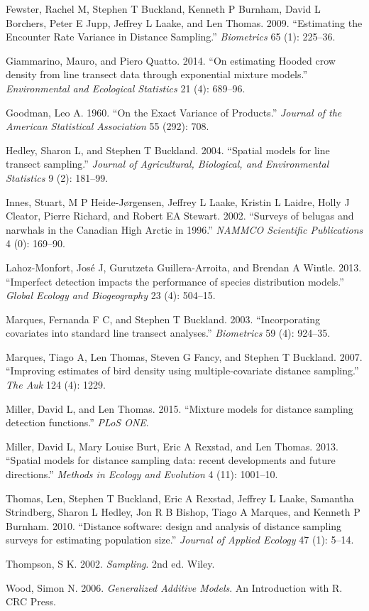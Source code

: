 \documentclass[article]{jss}
\begin{document}
Fewster, Rachel M, Stephen T Buckland, Kenneth P Burnham, David L
Borchers, Peter E Jupp, Jeffrey L Laake, and Len Thomas. 2009.
``Estimating the Encounter Rate Variance in Distance Sampling.''
\emph{Biometrics} 65 (1): 225--36.

Giammarino, Mauro, and Piero Quatto. 2014. ``On estimating Hooded crow
density from line transect data through exponential mixture models.''
\emph{Environmental and Ecological Statistics} 21 (4): 689--96.

Goodman, Leo A. 1960. ``On the Exact Variance of Products.''
\emph{Journal of the American Statistical Association} 55 (292): 708.

Hedley, Sharon L, and Stephen T Buckland. 2004. ``Spatial models for
line transect sampling.'' \emph{Journal of Agricultural, Biological, and
Environmental Statistics} 9 (2): 181--99.

Innes, Stuart, M P Heide-J{ø}rgensen, Jeffrey L Laake, Kristin L Laidre,
Holly J Cleator, Pierre Richard, and Robert EA Stewart. 2002. ``Surveys
of belugas and narwhals in the Canadian High Arctic in 1996.''
\emph{NAMMCO Scientific Publications} 4 (0): 169--90.

Lahoz-Monfort, Jos{é} J, Gurutzeta Guillera-Arroita, and Brendan A
Wintle. 2013. ``Imperfect detection impacts the performance of species
distribution models.'' \emph{Global Ecology and Biogeography} 23 (4):
504--15.

Marques, Fernanda F C, and Stephen T Buckland. 2003. ``Incorporating
covariates into standard line transect analyses.'' \emph{Biometrics} 59
(4): 924--35.

Marques, Tiago A, Len Thomas, Steven G Fancy, and Stephen T Buckland.
2007. ``Improving estimates of bird density using multiple-covariate
distance sampling.'' \emph{The Auk} 124 (4): 1229.

Miller, David L, and Len Thomas. 2015. ``Mixture models for distance
sampling detection functions.'' \emph{PLoS ONE}.

Miller, David L, Mary Louise Burt, Eric A Rexstad, and Len Thomas. 2013.
``Spatial models for distance sampling data: recent developments and
future directions.'' \emph{Methods in Ecology and Evolution} 4 (11):
1001--10.

Thomas, Len, Stephen T Buckland, Eric A Rexstad, Jeffrey L Laake,
Samantha Strindberg, Sharon L Hedley, Jon R B Bishop, Tiago A Marques,
and Kenneth P Burnham. 2010. ``Distance software: design and analysis of
distance sampling surveys for estimating population size.''
\emph{Journal of Applied Ecology} 47 (1): 5--14.

Thompson, S K. 2002. \emph{Sampling}. 2nd ed. Wiley.

Wood, Simon N. 2006. \emph{Generalized Additive Models}. An Introduction
with R. CRC Press.
\end{document}
